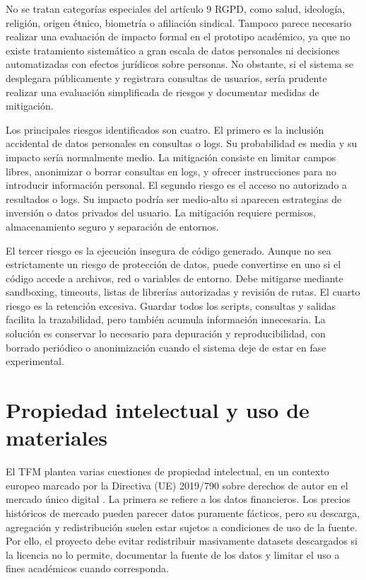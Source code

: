 \documentclass{article}
\begin{document}
No se tratan categorías especiales del artículo 9 RGPD, como salud, ideología, religión, origen étnico, biometría o afiliación sindical. Tampoco parece necesario realizar una evaluación de impacto formal en el prototipo académico, ya que no existe tratamiento sistemático a gran escala de datos personales ni decisiones automatizadas con efectos jurídicos sobre personas. No obstante, si el sistema se desplegara públicamente y registrara consultas de usuarios, sería prudente realizar una evaluación simplificada de riesgos y documentar medidas de mitigación.

Los principales riesgos identificados son cuatro. El primero es la inclusión accidental de datos personales en consultas o logs. Su probabilidad es media y su impacto sería normalmente medio. La mitigación consiste en limitar campos libres, anonimizar o borrar consultas en logs, y ofrecer instrucciones para no introducir información personal. El segundo riesgo es el acceso no autorizado a resultados o logs. Su impacto podría ser medio-alto si aparecen estrategias de inversión o datos privados del usuario. La mitigación requiere permisos, almacenamiento seguro y separación de entornos.

El tercer riesgo es la ejecución insegura de código generado. Aunque no sea estrictamente un riesgo de protección de datos, puede convertirse en uno si el código accede a archivos, red o variables de entorno. Debe mitigarse mediante sandboxing, timeouts, listas de librerías autorizadas y revisión de rutas. El cuarto riesgo es la retención excesiva. Guardar todos los scripts, consultas y salidas facilita la trazabilidad, pero también acumula información innecesaria. La solución es conservar lo necesario para depuración y reproducibilidad, con borrado periódico o anonimización cuando el sistema deje de estar en fase experimental.

\section{Propiedad intelectual y uso de materiales}

El TFM plantea varias cuestiones de propiedad intelectual, en un contexto europeo marcado por la Directiva (UE) 2019/790 sobre derechos de autor en el mercado único digital \cite{eu2019copyright}. La primera se refiere a los datos financieros. Los precios históricos de mercado pueden parecer datos puramente fácticos, pero su descarga, agregación y redistribución suelen estar sujetos a condiciones de uso de la fuente. Por ello, el proyecto debe evitar redistribuir masivamente datasets descargados si la licencia no lo permite, documentar la fuente de los datos y limitar el uso a fines académicos cuando corresponda.
\end{document}
